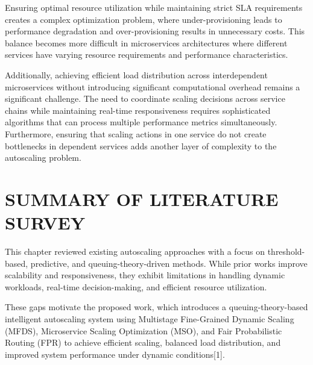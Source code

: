 Ensuring optimal resource utilization while maintaining strict SLA requirements creates a complex optimization problem, where under-provisioning leads to performance degradation and over-provisioning results in unnecessary costs. This balance becomes more difficult in microservices architectures where different services have varying resource requirements and performance characteristics.

Additionally, achieving efficient load distribution across interdependent microservices without introducing significant computational overhead remains a significant challenge. The need to coordinate scaling decisions across service chains while maintaining real-time responsiveness requires sophisticated algorithms that can process multiple performance metrics simultaneously. Furthermore, ensuring that scaling actions in one service do not create bottlenecks in dependent services adds another layer of complexity to the autoscaling problem.

\section{SUMMARY OF LITERATURE SURVEY}

This chapter reviewed existing autoscaling approaches with a focus on threshold-based, predictive, and queuing-theory-driven methods. While prior works improve scalability and responsiveness, they exhibit limitations in handling dynamic workloads, real-time decision-making, and efficient resource utilization.

These gaps motivate the proposed work, which introduces a queuing-theory-based intelligent autoscaling system using Multistage Fine-Grained Dynamic Scaling (MFDS), Microservice Scaling Optimization (MSO), and Fair Probabilistic Routing (FPR) to achieve efficient scaling, balanced load distribution, and improved system performance under dynamic conditions[1].